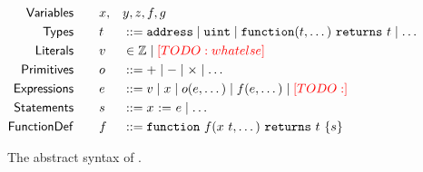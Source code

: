 \begin{figure}
  \begin{alignat*}{3}
    \mathsf{Variables}  \qquad & x,&&y,z,f,g \\
    \mathsf{Types}      \qquad & t && ::=
      \texttt{address} \mid
      \texttt{uint} \mid
      \texttt{function}(t, \dots)~\texttt{returns}~t \mid
      \dots \\
    \mathsf{Literals}    \qquad & v && \in
      \mathbb{Z} \mid
      {\color{red}[TODO: whatelse]} \\
    \mathsf{Primitives} \qquad & o && ::=
      + \mid
      - \mid
      \times \mid
      \dots \\
    \mathsf{Expressions}\qquad & e && ::=
      v \mid
      x \mid
      o(e, \dots) \mid
      f(e, \dots) \mid
      {\color{red}[TODO: ]} \\
    \mathsf{Statements} \qquad & s && ::=
      x ~\mathsf{:=}~ e \mid
      \dots \\
    \mathsf{Function Def} \qquad & f && ::=
      \texttt{function}~f(x ~ t, \dots)~\texttt{returns}~t~\{ s \}
  \end{alignat*}
  \caption{The abstract syntax of \lang.}
  \label{fig:syntax}
\end{figure}
